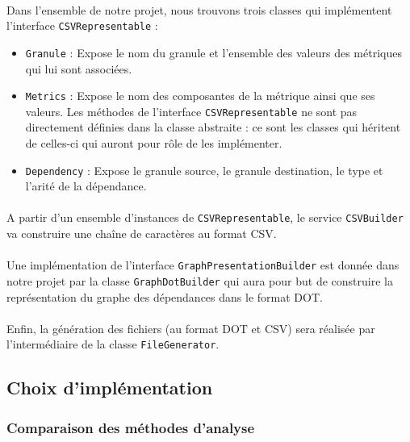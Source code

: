 \documentclass{scrartcl}
\begin{document}
    \paragraph{}Dans l'ensemble de notre projet, nous trouvons trois classes qui implémentent l'interface \texttt{CSVRepresentable} :
    \begin{itemize}
        \item \texttt{Granule} : Expose le nom du granule et l'ensemble des valeurs des métriques qui lui sont associées. 
        \item \texttt{Metrics} : Expose le nom des composantes de la métrique ainsi que ses valeurs. Les méthodes de l'interface \texttt{CSVRepresentable} ne sont pas directement définies dans la classe abstraite : ce sont les classes qui héritent de celles-ci qui auront pour rôle de les implémenter. 
        \item \texttt{Dependency} : Expose le granule source, le granule destination, le type et l'arité de la dépendance.
    \end{itemize}
    
    \paragraph{}A partir d'un ensemble d'instances de \texttt{CSVRepresentable}, le service \texttt{CSVBuilder} va construire une chaîne de caractères au format CSV. 
    
    \paragraph{}Une implémentation de l'interface \texttt{GraphPresentationBuilder} est donnée dans notre projet par la classe \texttt{GraphDotBuilder} qui aura pour but de construire la représentation du graphe des dépendances dans le format DOT.
    
    \paragraph{}Enfin, la génération des fichiers (au format DOT et CSV) sera réalisée par l'intermédiaire de la classe \texttt{FileGenerator}.

\subsection{Choix d'implémentation}

    \subsubsection{Comparaison des méthodes d'analyse}
    \label{methodsComparison}
\end{document}
